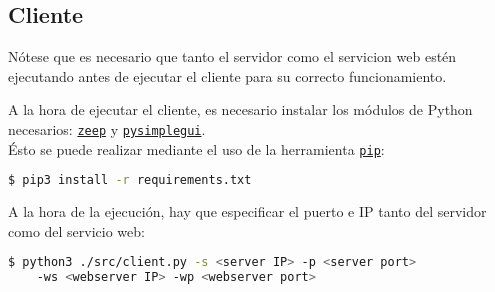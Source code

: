 \subsection{Cliente}

Nótese que es necesario que tanto el servidor como el servicion web estén ejecutando antes de ejecutar el cliente para su correcto funcionamiento.\newline

A la hora de ejecutar el cliente, es necesario instalar los módulos de Python necesarios: \href{https://pypi.org/project/zeep/}{\texttt{zeep}} y \href{https://pypi.org/project/pysimplegui/}{\texttt{pysimplegui}}.\\

Ésto se puede realizar mediante el uso de la herramienta \href{https://pypi.org/project/pip/}{\texttt{pip}}:

\begin{lstlisting}[language=bash]
    $ pip3 install -r requirements.txt
\end{lstlisting}

A la hora de la ejecución, hay que especificar el puerto e IP tanto del servidor como del servicio web:
\begin{lstlisting}[language=bash]
    $ python3 ./src/client.py -s <server IP> -p <server port>
    -ws <webserver IP> -wp <webserver port>
\end{lstlisting}
